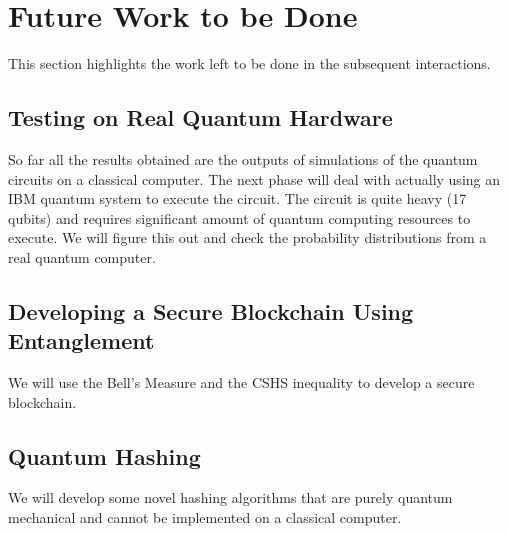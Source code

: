 \section{Future Work to be Done}
This section highlights the work left to be done in the subsequent interactions.
\subsection{Testing on Real Quantum Hardware}
So far all the results obtained are the outputs of simulations of the quantum circuits on a classical computer. The next phase will deal with actually using an IBM quantum system to execute the circuit. The circuit is quite heavy (17 qubits) and requires significant amount of quantum computing resources to execute. We will figure this out and check the probability distributions from a real quantum computer\cite{qsys}. 
\subsection{Developing a Secure Blockchain Using Entanglement}
We will use the Bell's Measure and the CSHS inequality to develop a secure blockchain\cite{ent}\cite{qkd}.
\subsection{Quantum Hashing}
We will develop some novel hashing algorithms that are purely quantum mechanical and cannot be implemented on a classical computer.